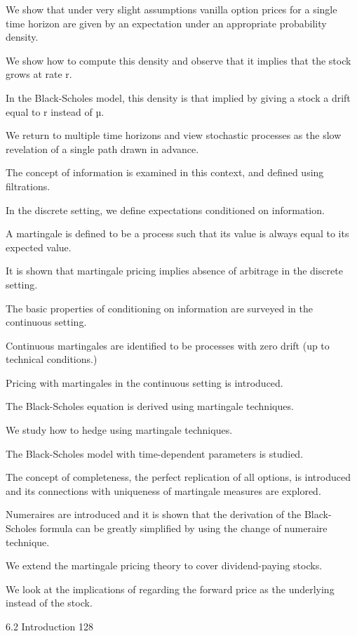 We show that under very slight assumptions vanilla option prices for a single time horizon are given by an expectation under an appropriate probability density.

We show how to compute this density and observe that it implies that the stock grows at rate r.

In the Black-Scholes model, this density is that implied by giving a stock a drift equal to r instead of µ.

We return to multiple time horizons and view stochastic processes as the slow revelation of a single path drawn in advance.

The concept of information is examined in this context, and defined using filtrations.

In the discrete setting, we define expectations conditioned on information.

A martingale is defined to be a process such that its value is always equal to its expected value.

It is shown that martingale pricing implies absence of arbitrage in the discrete setting.

The basic properties of conditioning on information are surveyed in the continuous setting.

Continuous martingales are identified to be processes with zero drift (up to technical conditions.)

Pricing with martingales in the continuous setting is introduced.

The Black-Scholes equation is derived using martingale techniques.

We study how to hedge using martingale techniques.

The Black-Scholes model with time-dependent parameters is studied.

The concept of completeness, the perfect replication of all options, is introduced and its connections with uniqueness of martingale measures are explored.

Numeraires are introduced and it is shown that the derivation of the Black-Scholes formula can be greatly simplified by using the change of numeraire technique.

We extend the martingale pricing theory to cover dividend-paying stocks.

We look at the implications of regarding the forward price as the underlying instead of the stock.

6.2 Introduction 128



